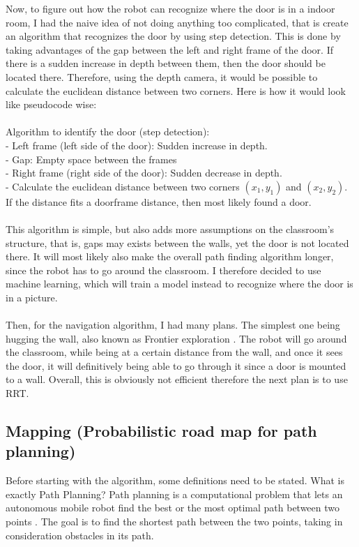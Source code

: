 \documentclass{article}
\begin{document}
Now, to figure out how the robot can recognize where the door is in a indoor room, I had the naive idea of not doing anything too complicated, that is create an algorithm that recognizes the door by using step detection. This is done by taking advantages of the gap between the left and right frame of the door. If there is a sudden increase in depth between them, then the door should be located there. Therefore, using the depth camera, it would be possible to calculate the euclidean distance between two corners. Here is how it would look like pseudocode wise: \\\\
Algorithm to identify the door (step detection): \\
- Left frame (left side of the door): Sudden increase in depth. \\
- Gap: Empty space between the frames \\
- Right frame (right side of the door): Sudden decrease in depth. \\
- Calculate the euclidean distance between two corners $(x_1, y_1)$ and $(x_2, y_2)$. If the distance fits a doorframe distance, then most likely found a door. \\\\
This algorithm is simple, but also adds more assumptions on the classroom's structure, that is, gaps may exists between the walls, yet the door is not located there. It will most likely also make the overall path finding algorithm longer, since the robot has to go around the classroom. I therefore decided to use machine learning, which will train a model instead to recognize where the door is in a picture. \\\\
Then, for the navigation algorithm, I had many plans. The simplest one being hugging the wall, also known as Frontier exploration \cite{Liu_ScientificReports_2025}. The robot will go around the classroom, while being at a certain distance from the wall, and once it sees the door, it will definitively being able to go through it since a door is mounted to a wall. Overall, this is obviously not efficient therefore the next plan is to use RRT. \\


\subsection{Mapping (Probabilistic road map for path planning)}
Before starting with the algorithm, some definitions need to be stated. What is exactly Path Planning? Path planning is a computational problem that lets an autonomous mobile robot find the best or the most optimal path between two points \cite{Khokhar_PRM_2021}.
The goal is to find the shortest path between the two points, taking in consideration obstacles in its path. \\
\end{document}
